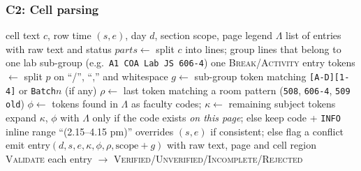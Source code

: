 \subsubsection{C2: Cell parsing}
\begin{algorithm}[H]
\caption{Parse one grid cell into entries}\label{alg:cell}
\begin{algorithmic}[1]
\Require cell text $c$, row time $(s,e)$, day $d$, section scope, page legend $\Lambda$
\Ensure list of entries with raw text and status
\State $\mathit{parts} \gets$ split $c$ into lines; group lines that belong to one lab sub-group (e.g.\ \texttt{A1 COA Lab JS 606-4})
 \Return one \textsc{Break}/\textsc{Activity} entry \EndIf
{}
   \State tokens $\gets$ split $p$ on ``/'', ``,'' and whitespace
   \State $g \gets$ sub-group token matching \texttt{[A-D][1-4]} or \texttt{Batch$n$} (if any)
   \State $\rho \gets$ last token matching a room pattern (\texttt{508}, \texttt{606-4}, \texttt{509 old})
   \State $\phi \gets$ tokens found in $\Lambda$ as faculty codes; $\kappa \gets$ remaining subject tokens
   \State expand $\kappa$, $\phi$ with $\Lambda$ only if the code exists \emph{on this page}; else keep code + \texttt{INFO}
   \State inline range ``(2.15--4.15 pm)'' overrides $(s,e)$ if consistent; else flag a conflict
   \State emit entry$(d, s, e, \kappa, \phi, \rho, \text{scope} + g)$ with raw text, page and cell region
\EndFor
\State \textsc{Validate} each entry $\rightarrow$ \textsc{Verified}/\textsc{Unverified}/\textsc{Incomplete}/\textsc{Rejected}
\end{algorithmic}
\end{algorithm}

